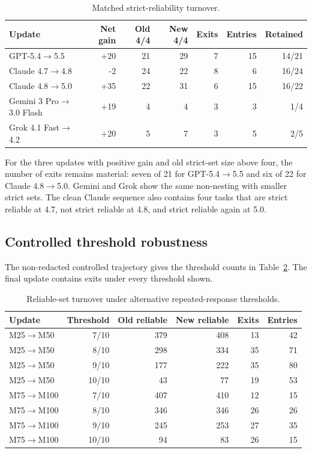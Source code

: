 \documentclass[11pt,letterpaper]{article}
\theoremstyle{plain}
\newcommand{\1}{\mathbf 1}
\begin{document}
\begin{table}[H]
\centering
\caption{Matched strict-reliability turnover.}
\label{tab:s_turnover}
\begin{tabular}{lrrrrrr}
\toprule
Update & Net gain & Old 4/4 & New 4/4 & Exits & Entries & Retained \\
\midrule
GPT-5.4$\rightarrow$5.5 & +20 & 21 & 29 & 7 & 15 & 14/21 \\
Claude 4.7$\rightarrow$4.8 & -2 & 24 & 22 & 8 & 6 & 16/24 \\
Claude 4.8$\rightarrow$5.0 & +35 & 22 & 31 & 6 & 15 & 16/22 \\
Gemini 3 Pro$\rightarrow$3.0 Flash & +19 & 4 & 4 & 3 & 3 & 1/4 \\
Grok 4.1 Fast$\rightarrow$4.2 & +20 & 5 & 7 & 3 & 5 & 2/5 \\
\bottomrule
\end{tabular}
\end{table}

For the three updates with positive gain and old strict-set size above four, the number of exits remains material: seven of 21 for GPT-5.4$\rightarrow$5.5 and six of 22 for Claude 4.8$\rightarrow$5.0. Gemini and Grok show the same non-nesting with smaller strict sets. The clean Claude sequence also contains four tasks that are strict reliable at 4.7, not strict reliable at 4.8, and strict reliable again at 5.0.

\subsection{Controlled threshold robustness}
The non-redacted controlled trajectory gives the threshold counts in Table~\ref{tab:s_threshold}. The final update contains exits under every threshold shown.

\begin{table}[H]
\centering
\caption{Reliable-set turnover under alternative repeated-response thresholds.}
\label{tab:s_threshold}
\begin{tabular}{lrrrrr}
\toprule
Update & Threshold & Old reliable & New reliable & Exits & Entries \\
\midrule
M25$\rightarrow$M50 & 7/10 & 379 & 408 & 13 & 42 \\
M25$\rightarrow$M50 & 8/10 & 298 & 334 & 35 & 71 \\
M25$\rightarrow$M50 & 9/10 & 177 & 222 & 35 & 80 \\
M25$\rightarrow$M50 & 10/10 & 43 & 77 & 19 & 53 \\
M75$\rightarrow$M100 & 7/10 & 407 & 410 & 12 & 15 \\
M75$\rightarrow$M100 & 8/10 & 346 & 346 & 26 & 26 \\
M75$\rightarrow$M100 & 9/10 & 245 & 253 & 27 & 35 \\
M75$\rightarrow$M100 & 10/10 & 94 & 83 & 26 & 15 \\
\bottomrule
\end{tabular}
\end{table}
\end{document}
